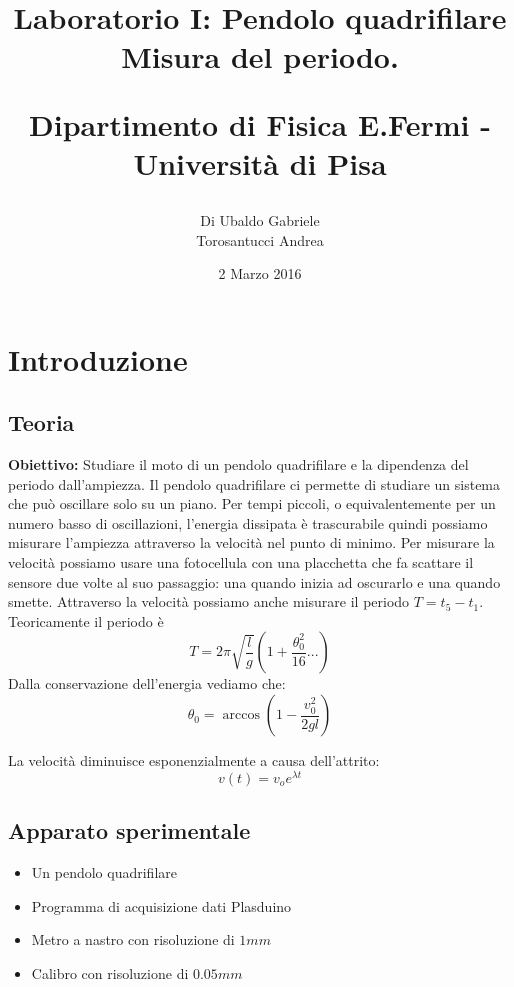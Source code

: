 \documentclass[a4paper,10pt]{article}
\title{Laboratorio I: Pendolo quadrifilare\\ Misura del periodo.\\
\begin{large}
Dipartimento di Fisica E.Fermi - Università di Pisa
\end{large}}
\author{Di Ubaldo Gabriele \\Torosantucci Andrea}
\date{2 Marzo 2016}
\begin{document}
\maketitle

\tableofcontents

\section{Introduzione}
\subsection{Teoria}
\textbf{Obiettivo:} Studiare il moto di un pendolo quadrifilare e la dipendenza del periodo dall'ampiezza.
Il pendolo quadrifilare ci permette di studiare un sistema che può oscillare solo su un piano. Per tempi piccoli, o equivalentemente per un numero basso di oscillazioni, l'energia dissipata
è trascurabile quindi possiamo misurare l'ampiezza attraverso la velocità nel punto di minimo. Per misurare la velocità possiamo usare una fotocellula con una placchetta che fa scattare il sensore
due volte al suo passaggio: una quando inizia ad oscurarlo e una quando smette. Attraverso la velocità possiamo anche misurare il periodo $T=t_5-t_1$. Teoricamente il periodo è
\begin{equation}
 T=2\pi\sqrt{\frac{l}{g}}(1+\frac{\theta_0^2}{16}...)
\end{equation}
Dalla conservazione dell'energia vediamo che:
\begin{equation}
 \theta_0=\arccos(1-\frac{v_0^2}{2gl})
\end{equation}

La velocità diminuisce esponenzialmente a causa dell'attrito:
\begin{equation}
 v(t)=v_oe^{\lambda t}
\end{equation}

\subsection{Apparato sperimentale}
\begin{itemize}
\item{Un pendolo quadrifilare}
\item{Programma di acquisizione dati Plasduino}
\item{Metro a nastro con risoluzione di $1 mm$}
\item{Calibro con risoluzione di $0.05mm$}
\end{itemize}
\end{document}
